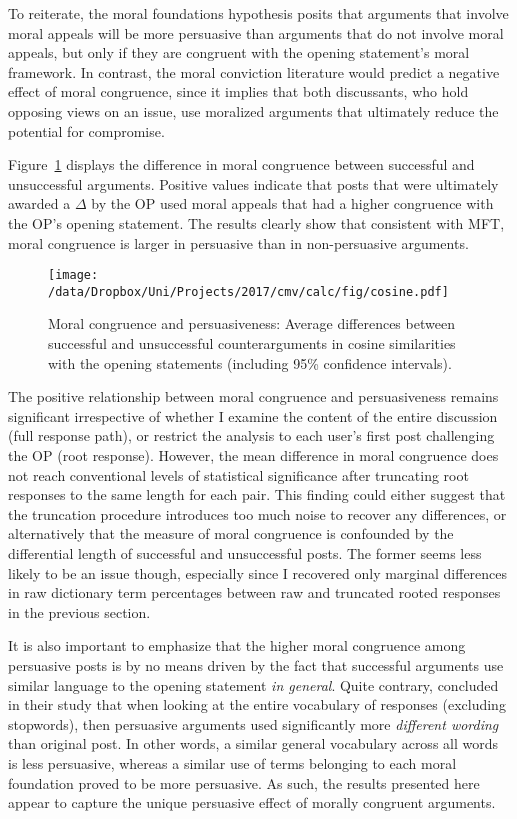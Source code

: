 To reiterate, the moral foundations hypothesis posits that arguments that involve moral appeals will be more persuasive than arguments that do not involve moral appeals, but only if they are congruent with the opening statement's moral framework. In contrast, the moral conviction literature would predict a negative effect of moral congruence, since it implies that both discussants, who hold opposing views on an issue, use moralized arguments that ultimately reduce the potential for compromise.

Figure~\ref{fig:cosine} displays the difference in moral congruence between successful and unsuccessful arguments. Positive values indicate that posts that were ultimately awarded a $\Delta$ by the OP used moral appeals that had a higher congruence with the OP's opening statement. The results clearly show that consistent with MFT, moral congruence is larger in persuasive than in non-persuasive arguments.

\begin{figure}[ht]
\centering
\texttt{[image: /data/Dropbox/Uni/Projects/2017/cmv/calc/fig/cosine.pdf]}
\caption[Moral congruence and persuasiveness]{Moral congruence and persuasiveness: Average differences between successful and unsuccessful counterarguments in cosine similarities with the opening statements (including 95\% confidence intervals).}\label{fig:cosine}
\end{figure}

The positive relationship between moral congruence and persuasiveness remains significant irrespective of whether I examine the content of the entire discussion (full response path), or restrict the analysis to each user's first post challenging the OP (root response). However, the mean difference in moral congruence does not reach conventional levels of statistical significance after truncating root responses to the same length for each pair. This finding could either suggest that the truncation procedure introduces too much noise to recover any differences, or alternatively that the measure of moral congruence is confounded by the differential length of successful and unsuccessful posts. The former seems less likely to be an issue though, especially since I recovered only marginal differences in raw dictionary term percentages between raw and truncated rooted responses in the previous section.

It is also important to emphasize that the higher moral congruence among persuasive posts is by no means driven by the fact that successful arguments use similar language to the opening statement \textit{in general}. Quite contrary, \citet[618]{tan2016winning} concluded in their study that when looking at the entire vocabulary of responses (excluding stopwords),  then persuasive arguments used significantly more \textit{different wording} than original post. In other words, a similar general vocabulary across all words is less persuasive, whereas a similar use of terms belonging to each moral foundation proved to be more persuasive. As such, the results presented here appear to capture the unique persuasive effect of morally congruent arguments.




